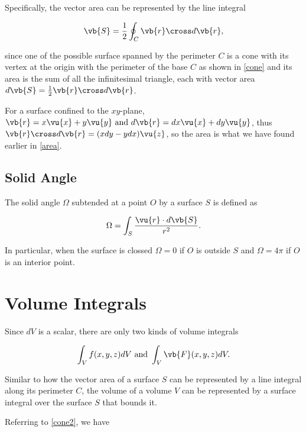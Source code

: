 \documentclass[english,a4paper,12pt]{report}
\begin{document}
Specifically, the vector area can be represented by the line integral 

\begin{equation}
	\vb{S} = \frac{1}{2} \oint_{C} \vb{r} \cross d\vb{r}, 
\end{equation}

since one of the possible surface spanned by the perimeter \(C\) is a cone with its vertex at the origin with the perimeter of the base \(C\) as shown in \cref{cone} and its area is the sum of all the infinitesimal triangle, each with vector area \(d\vb{S} = \frac{1}{2} \vb{r} \cross d\vb{r}  \).  


For a surface confined to the \(xy\)-plane, \(\vb{r} = x \vu{x} + y \vu{y} \text { and } d\vb{r} = dx \vu{x} + dy \vu{y}\), thus \(\vb{r} \cross d\vb{r} = (xdy-ydx)\vu{z}\), so the area is what we have found earlier in \cref{area}.   


\subsection{Solid Angle}

The solid angle \(\Omega \) subtended at a point \(O\) by a surface \(S\) is defined as 

\begin{equation}
	\Omega = \int_{S}^{} \frac{\vu{r} \cdot d\vb{S} }{r^2} . 
\end{equation}

In particular, when the surface is clossed \(\Omega = 0\) if \(O\) is outside \(S\) and \(\Omega = 4\pi \) if \(O\) is an interior point.  

\section{Volume Integrals}

Since \(dV\) is a scalar, there are only two kinds of volume integrals

\begin{equation}
	\int_{V}^{} f(x,y,z)dV \text { and } \int_{V}^{} \vb{F} (x,y,z) dV.    
\end{equation}


Similar to how the vector area of a surface \(S\) can be represented by a line integral along its perimeter \(C\), the volume of a volume \(V\)  can be represented by a surface integral over the surface \(S\) that bounds it.

Referring to \cref{cone2}, we have
\end{document}
